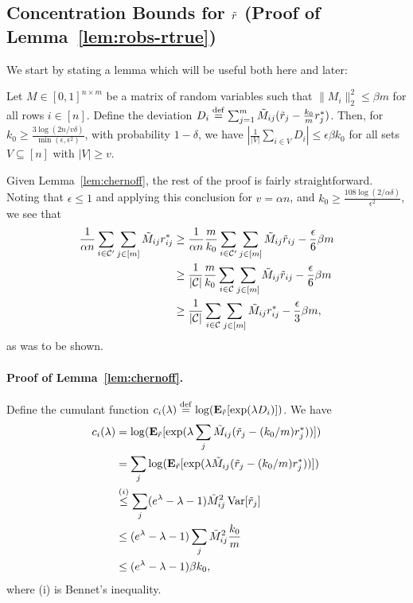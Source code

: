 \subsection{Concentration Bounds for $\tilde{r}$ (Proof of Lemma~\ref{lem:robs-rtrue})}
\label{sec:concentration-proof}
We start by stating a lemma which will be useful both here and later:
\begin{lemma}
\label{lem:chernoff}
Let $M \in [0,1]^{n \times m}$ be a matrix of random variables 
such that $\|M_i\|_2^2 \leq \beta m$ for all rows $i \in [n]$. 
Define the deviation $D_i \stackrel{\rm def}{=} \sum_{j=1}^m \tilde{M}_{ij}(\tilde{r}_j - \frac{k_0}{m}r^*_j)$. 
Then, for $k_0 \geq \frac{3\log(2n/v\delta)}{\min(\epsilon,\epsilon^2)}$, 
with probability $1-\delta$, we have 
$\left|\frac{1}{|V|} \sum_{i \in V} D_{i}\right| \leq \epsilon \beta k_0$ for all 
sets $V \subseteq [n]$ with $|V| \geq v$.
\end{lemma}
Given Lemma~\ref{lem:chernoff}, the rest of the proof is fairly straightforward.
Noting that $\epsilon \leq 1$ and applying this conclusion for 
$v = \alpha n$, and $k_0 \geq \frac{108\log(2/\alpha\delta)}{\epsilon^2}$, 
we see that
\begin{align}
\frac{1}{\alpha n} \sum_{i \in \mathcal{C}'} \sum_{j \in [m]} \tilde{M}_{ij} r^*_{ij} &\geq \frac{1}{\alpha n}\frac{m}{k_0} \sum_{i \in \mathcal{C}'} \sum_{j \in [m]} \tilde{M}_{ij} \tilde{r}_{ij} - \frac{\epsilon}{6} \beta m \\
 &\geq \frac{1}{|\mathcal{C}|}\frac{m}{k_0} \sum_{i \in \mathcal{C}} \sum_{j \in [m]} \tilde{M}_{ij} \tilde{r}_{ij} - \frac{\epsilon}{6} \beta m \\
 &\geq \frac{1}{|\mathcal{C}|}\sum_{i \in \mathcal{C}} \sum_{j \in [m]} \tilde{M}_{ij} r^*_{ij} - \frac{\epsilon}{3} \beta m,
\end{align}
as was to be shown.

\paragraph{Proof of Lemma~\ref{lem:chernoff}.}
Define the cumulant function $c_i(\lambda) \stackrel{\rm def}{=} \log(\mathbf{E}_{\tilde{r}}[\exp(\lambda D_i)])$. We have
\begin{align}
c_i(\lambda) &=\log(\mathbf{E}_{\tilde{r}}[\exp(\lambda \sum_j \tilde{M}_{ij}(\tilde{r}_j - (k_0/m)r^*_j))]) \\
 &=\sum_j \log(\mathbf{E}_{\tilde{r}}[\exp(\lambda \tilde{M}_{ij}(\tilde{r}_j - (k_0/m)r^*_j))]) \\
 &\stackrel{(i)}{\leq} \sum_j (e^{\lambda} - \lambda - 1)\tilde{M}_{ij}^2\operatorname{Var}[\tilde{r}_j] \\
 &\leq (e^{\lambda} - \lambda - 1) \sum_j \tilde{M}_{ij}^2 \frac{k_0}{m} \\
 &\leq (e^{\lambda}-\lambda-1)\beta k_0,
\end{align}
where (i) is Bennet's inequality.

